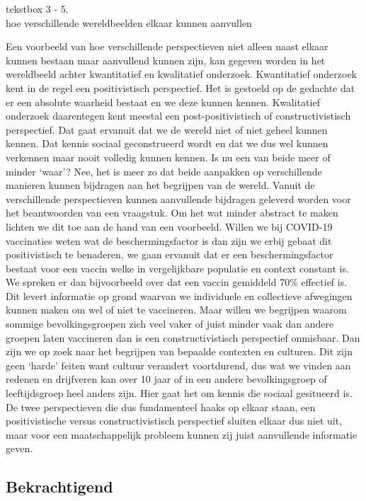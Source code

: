 \documentclass[empirical, authordate, ]{new-jote-article}
\begin{document}
	\begin{bookbox}{\raggedright tekstbox 3 - 5. \\hoe verschillende wereldbeelden elkaar kunnen aanvullen}
		Een voorbeeld van hoe verschillende perspectieven niet alleen naast elkaar kunnen bestaan maar aanvullend kunnen zijn, kan gegeven worden in het wereldbeeld achter kwantitatief en kwalitatief onderzoek. Kwantitatief onderzoek kent in de regel een positivistisch perspectief. Het is gestoeld op de gedachte dat er een absolute waarheid bestaat en we deze kunnen kennen. Kwalitatief onderzoek daarentegen kent meestal een post-positivistisch of constructivistisch perspectief. Dat gaat ervanuit dat we de wereld niet of niet geheel kunnen kennen. Dat kennis sociaal geconstrueerd wordt en dat we dus wel kunnen verkennen maar nooit volledig kunnen kennen. Is nu een van beide meer of minder ‘waar'? Nee, het is meer zo dat beide aanpakken op verschillende manieren kunnen bijdragen aan het begrijpen van de wereld. Vanuit de verschillende perspectieven kunnen aanvullende bijdragen geleverd worden voor het beantwoorden van een vraagstuk. Om het wat minder abstract te maken lichten we dit toe aan de hand van een voorbeeld. Willen we bij COVID-19 vaccinaties weten wat de beschermingsfactor is dan zijn we erbij gebaat dit positivistisch te benaderen, we gaan ervanuit dat er een beschermingsfactor bestaat voor een vaccin welke in vergelijkbare populatie en context constant is. We spreken er dan bijvoorbeeld over dat een vaccin gemiddeld 70\% effectief is. Dit levert informatie op grond waarvan we individuele en collectieve afwegingen kunnen maken om wel of niet te vaccineren. Maar willen we begrijpen waarom sommige bevolkingsgroepen zich veel vaker of juist minder vaak dan andere groepen laten vaccineren dan is een constructivistisch perspectief onmisbaar. Dan zijn we op zoek naar het begrijpen van bepaalde contexten en culturen. Dit zijn geen ‘harde' feiten want cultuur verandert voortdurend, dus wat we vinden aan redenen en drijfveren kan over 10 jaar of in een andere bevolkingsgroep of leeftijdsgroep heel anders zijn. Hier gaat het om kennis die sociaal gesitueerd is. De twee perspectieven die dus fundamenteel haaks op elkaar staan, een positivistische versus constructivistisch perspectief sluiten elkaar dus niet uit, maar voor een maatschappelijk probleem kunnen zij juist aanvullende informatie geven.
	\end{bookbox}

	\subsection{Bekrachtigend}
\end{document}
